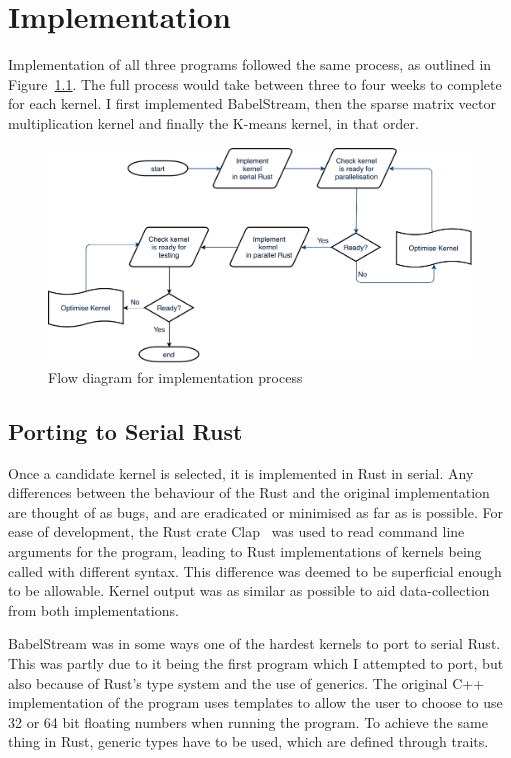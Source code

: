 \chapter{Implementation}\label{sec:impl}
Implementation of all three programs followed the same process, as outlined in Figure~\ref{fig:imp-flow}. The full process would take between three to four weeks to complete for each kernel. I first implemented BabelStream, then the sparse matrix vector multiplication kernel and finally the K-means kernel, in that order.

\begin{figure}[h]
  \center
  \includegraphics[width=\linewidth]{figs/ImplementationFlow.pdf}
  \caption{Flow diagram for implementation process}
  \label{fig:imp-flow}
\end{figure}

\section{Porting to Serial Rust}
Once a candidate kernel is selected, it is implemented in Rust in serial. Any differences between the  behaviour of the Rust and the original implementation are thought of as bugs, and are eradicated or minimised as far as is possible. For ease of development, the Rust crate Clap~\cite{RustClap} was used to read command line arguments for the program, leading to Rust implementations of kernels being called with different syntax. This difference was deemed to be superficial enough to be allowable. Kernel output was as similar as possible to aid data-collection from both implementations.

BabelStream was in some ways one of the hardest kernels to port to serial Rust. This was partly due to it being the first program which I attempted to port, but also because of Rust's type system and the use of generics. The original C++ implementation of the program uses templates to allow the user to choose to use 32 or 64 bit floating numbers when running the program. To achieve the same thing in Rust, generic types have to be used, which are defined through traits.

